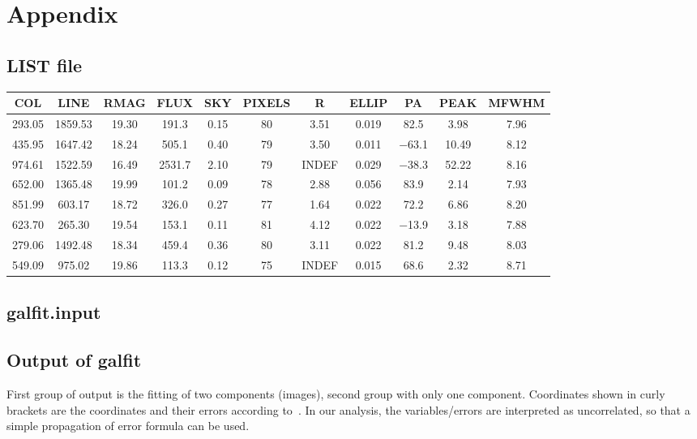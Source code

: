 \appendix
\chapter{Appendix}
\section{LIST file}\label{app:LIST}
\begin{tabular}{ccccccccccc}
   \toprule
COL & LINE & RMAG & FLUX & SKY & PIXELS & R & ELLIP & PA & PEAK & MFWHM\\
\midrule
\num{293.05} & \num{1859.53} & \num{19.30} & \num{191.3} & \num{0.15} & \num{80} & \num{3.51} & \num{0.019} & \num{82.5} & \num{3.98} & \num{7.96}\\
\num{435.95} & \num{1647.42} & \num{18.24} & \num{505.1} & \num{0.40} & \num{79} & \num{3.50} & \num{0.011} & \num{-63.1} & \num{10.49} & \num{8.12}\\
\num{974.61} & \num{1522.59} & \num{16.49} & \num{2531.7} & \num{2.10} & \num{79} & INDEF & \num{0.029} & \num{-38.3} & \num{52.22} & \num{8.16}\\
\num{652.00} & \num{1365.48} & \num{19.99} & \num{101.2} & \num{0.09} & \num{78} & \num{2.88} & \num{0.056} & \num{83.9} & \num{2.14} & \num{7.93}\\
\num{851.99} & \num{603.17} & \num{18.72} & \num{326.0} & \num{0.27} & \num{77} & \num{1.64} & \num{0.022} & \num{72.2} & \num{6.86} & \num{8.20}\\
\num{623.70} & \num{265.30} & \num{19.54} & \num{153.1} & \num{0.11} & \num{81} & \num{4.12} & \num{0.022} & \num{-13.9} & \num{3.18} & \num{7.88}\\
\num{279.06} & \num{1492.48} & \num{18.34} & \num{459.4} & \num{0.36} & \num{80} & \num{3.11} & \num{0.022} & \num{81.2} & \num{9.48} & \num{8.03}\\
\num{549.09} & \num{975.02} & \num{19.86} & \num{113.3} & \num{0.12} & \num{75} & INDEF & \num{0.015} & \num{68.6} & \num{2.32} & \num{8.71}\\
\bottomrule
\end{tabular}

\clearpage
\section{galfit.input}\label{app:galfit}


\clearpage
\section{Output of galfit}\label{app:galfitOut}
First group of output is the fitting of two components (images), second group with only one component. Coordinates shown in curly brackets are the coordinates and their errors according to~\cite{galfitManual}. In our analysis, the variables/errors are interpreted as uncorrelated, so that a simple propagation of error formula can be used.


